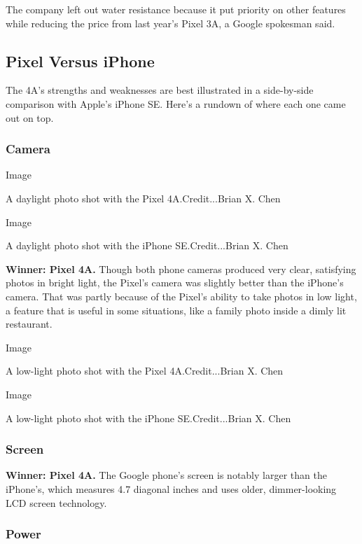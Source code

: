 The company left out water resistance because it put priority on other
features while reducing the price from last year's Pixel 3A, a Google
spokesman said.

\hypertarget{pixel-versus-iphone}{%
\subsection{Pixel Versus iPhone}\label{pixel-versus-iphone}}

The 4A's strengths and weaknesses are best illustrated in a side-by-side
comparison with Apple's iPhone SE. Here's a rundown of where each one
came out on top.

\hypertarget{camera}{%
\subsubsection{\texorpdfstring{\textbf{Camera}}{Camera}}\label{camera}}

Image

A daylight photo shot with the Pixel 4A.Credit...Brian X. Chen

Image

A daylight photo shot with the iPhone SE.Credit...Brian X. Chen

\textbf{Winner: Pixel 4A.} Though both phone cameras produced very
clear, satisfying photos in bright light, the Pixel's camera was
slightly better than the iPhone's camera. That was partly because of the
Pixel's ability to take photos in low light, a feature that is useful in
some situations, like a family photo inside a dimly lit restaurant.

Image

A low-light photo shot with the Pixel 4A.Credit...Brian X. Chen

Image

A low-light photo shot with the iPhone SE.Credit...Brian X. Chen

\hypertarget{screen}{%
\subsubsection{Screen}\label{screen}}

\textbf{Winner: Pixel 4A.} The Google phone's screen is notably larger
than the iPhone's, which measures 4.7 diagonal inches and uses older,
dimmer-looking LCD screen technology.

\hypertarget{power}{%
\subsubsection{Power}\label{power}}

